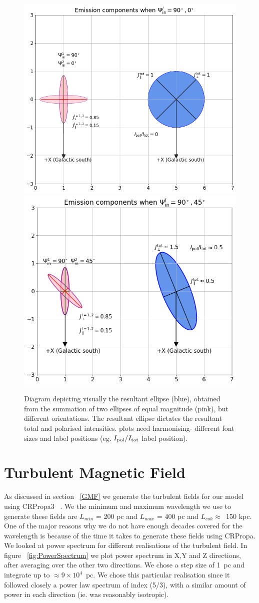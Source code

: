 \documentclass[usenatbib]{mnras}
\newcommand{\Andrew}[1]{\textcolor{dg}{#1}}
\begin{document}
\begin{figure}
\centering
\includegraphics[width = 0.49\linewidth]{Images/Total_intensity_Ellipses_circles_emissions.png}
\label{fig_tot_intensity}
\includegraphics[width = 0.49\linewidth]{Images/Pol_intensity_Ellipses_circles_emissions.png}
\label{fig_pol_intensity}
\caption{Diagram depicting visually the resultant ellipse (blue), obtained from the summation of two ellipses of equal magnitude (pink), but different orientations. The resultant ellipse dictates the resultant total and polarised intensities. \Andrew{plots need harmonising- different font sizes and label positions (eg. $I_{\rm pol}/I_{\rm tot}$ label position)}.}
\end{figure}


\section{Turbulent Magnetic Field}
\label{Appendix_B}
As discussed in section ~\ref{GMF} we generate the turbulent fields for our model using CRPropa3 ~\cite{CRPropa3_2016}. We the minimum and maximum wavelength we use to generate these fields are 
$L_{min}$ = 200 pc and $L_{max}$ = 400 pc and $L_{coh} \approx $~150 kpc. One of the major reasons why we do not have enough decades covered for the wavelength is because of the time it takes to generate these fields using CRPropa. 
We looked at power spectrum for different realisations of the turbulent field. In figure ~\ref{fig:PowerSpectrum} we plot power spectrum in X,Y and Z directions, after averaging over the other two directions. We chose a step size of 1~pc and integrate up to $\approx 9\times10^4$~pc. We chose this particular realisation since it followed closely a power law spectrum of index (5/3), with a similar amount of power in each direction (ie. was reasonably isotropic). 
\end{document}
